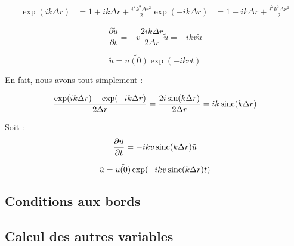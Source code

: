 \begin{align}
    \exp(ik\Delta{r}) &= 1 + ik\Delta{r} + \frac{i^2 k^2 \Delta{r}^2}{2}
    \exp(-ik\Delta{r}) &= 1 - ik\Delta{r} + \frac{i^2 k^2 \Delta{r}^2}{2}
\end{align}

\begin{equation}
    \frac{\partial \tilde{u}}{\partial t} = - v \frac{2ik\Delta{r}}{2\Delta{r}} \tilde{u} = - i k v \tilde{u}
\end{equation}

\begin{equation}
    \tilde{u} = \tilde{u(0)} \exp(-i k v t)
\end{equation}

En fait, nous avons tout simplement :

\begin{equation}
    \frac{\exp(ik\Delta{r}) - \exp(-ik\Delta{r})}{2 \Delta{r}} = \frac{2 i \sin(k\Delta{r})}{2 \Delta{r}} = i k \operatorname{sinc}(k\Delta{r})
\end{equation}

Soit :
\begin{equation}
    \frac{\partial \tilde{u}}{\partial t} = - i k v \operatorname{sinc}(k\Delta{r}) \tilde{u}
\end{equation}

\begin{equation}
    \tilde{u} = \tilde{u(0)} \exp(-i k v \operatorname{sinc}(k \Delta{r}) t)
\end{equation}

\subsection{Conditions aux bords}

\subsection{Calcul des autres variables}

